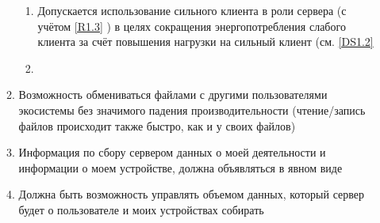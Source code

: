 \begin{enumerate}[label={\bfseries ПТ-\arabic*}]
\begin{enumerate}[label*={\bfseries.\arabic*}]
\begin{enumerate}[label*={\bfseries.\arabic*}]
                     \item Допускается использование сильного клиента в роли сервера (с учётом \ref{R1.3} %
                           ) в целях сокращения энергопотребления слабого клиента за счёт повышения нагрузки на сильный клиент (см. \ref{DS1.2} %
                     \item
                  \end{enumerate}
            \item Возможность обмениваться файлами с другими пользователями экосистемы без значимого падения производительности (чтение/запись файлов происходит также быстро, как и у своих файлов)
            \item Информация по сбору сервером данных о моей деятельности и информации о моем устройстве, должна объявляться в явном виде
            \item Должна быть возможность управлять объемом данных, который сервер будет о пользователе и моих устройствах собирать
         \end{enumerate}


\end{enumerate}
